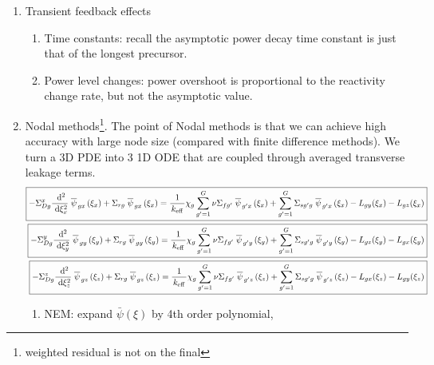 \documentclass{school-22.211-notes}
\begin{document}
\begin{enumerate}
\item Transient feedback effects
  \begin{enumerate}
  \item Time constants: recall the asymptotic power decay time constant is just that of the longest precursor. 
  \item Power level changes: power overshoot is proportional to the reactivity change rate, but not the asymptotic value. 
  \end{enumerate}

\item Nodal methods\footnote{weighted residual is not on the final}. The point of Nodal methods is that we can achieve high accuracy with large node size (compared with finite difference methods). We turn a 3D PDE into 3 1D ODE that are coupled through averaged transverse leakage terms. 
    \begin{align*}
      \boxed{ - \Sigma_{Dg}^x \frac{\mbox{ }\mathrm{d}^2}{\mbox{ }\mathrm{d} \xi_x^2} \left.\overline{\psi} \right._{gx} (\xi_x) + \Sigma_{rg} \left.\overline{\psi} \right._{gx} (\xi_x) = \frac{1}{\left. k_{\mathrm{eff}} \right.} \chi_g \displaystyle\sum_{g'=1}^G \nu \Sigma_{fg'} \left.\overline{\psi} \right._{g'x} (\xi_x) + \displaystyle\sum_{g'=1}^G \Sigma_{sg'g} \left.\overline{\psi} \right._{g'x} (\xi_x) - L_{gy} (\xi_x) - L_{gz} (\xi_x) }    \\
   \boxed{ - \Sigma_{Dg}^y \frac{\mbox{ }\mathrm{d}^2}{\mbox{ }\mathrm{d} \xi_y^2} \left.\overline{\psi} \right._{gy} (\xi_y) + \Sigma_{rg} \left.\overline{\psi} \right._{gy} (\xi_y) = \frac{1}{\left. k_{\mathrm{eff}} \right.} \chi_g \displaystyle\sum_{g'=1}^G \nu \Sigma_{fg'} \left.\overline{\psi} \right._{g'y} (\xi_y) + \displaystyle\sum_{g'=1}^G \Sigma_{sg'g} \left.\overline{\psi} \right._{g'y} (\xi_y) - L_{gz} (\xi_y) - L_{gx} (\xi_y) }  \\
     \boxed{ - \Sigma_{Dg}^z \frac{\mbox{ }\mathrm{d}^2}{\mbox{ }\mathrm{d} \xi_z^2} \left.\overline{\psi} \right._{gz} (\xi_z) + \Sigma_{rg} \left.\overline{\psi} \right._{gz} (\xi_z) = \frac{1}{\left. k_{\mathrm{eff}} \right.} \chi_g \displaystyle\sum_{g'=1}^G \nu \Sigma_{fg'} \left.\overline{\psi} \right._{g'z} (\xi_z) + \displaystyle\sum_{g'=1}^G \Sigma_{sg'g} \left.\overline{\psi} \right._{g'z} (\xi_z) - L_{gx} (\xi_z) - L_{gy} (\xi_z) } 
    \end{align*}
  \begin{enumerate}
    \item NEM: expand $\bar{\psi}(\xi)$ by 4th order polynomial, 


\end{enumerate}
\end{enumerate}
\end{document}
